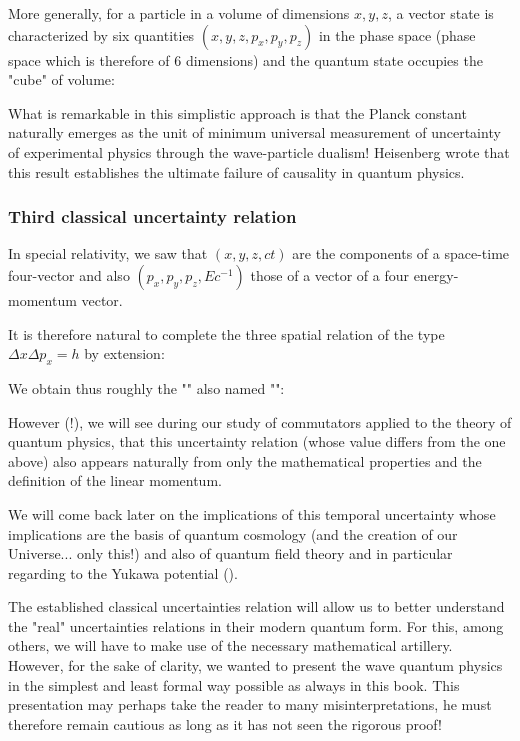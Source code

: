 	More generally, for a particle in a volume  of dimensions $x, y, z$, a vector state is characterized by six quantities $(x,y,z,p_x,p_y,p_z)$ in the phase space (phase space which is therefore of $6$ dimensions) and the quantum state occupies the "cube" of volume:
	
	What is remarkable in this simplistic approach is that the Planck constant naturally emerges as the unit of minimum universal measurement of uncertainty of experimental physics through the wave-particle dualism! Heisenberg wrote that this result establishes the ultimate failure of causality in quantum physics.
	
	\subsubsection{Third classical uncertainty relation}
	In special relativity, we saw that $(x, y, z, ct)$ are the components of a space-time four-vector and also $(p_x,p_y,p_z,Ec^{-1})$ those of a vector of a four energy-momentum vector.

	It is therefore natural to complete the three spatial relation of the type $\Delta x \Delta p_x=h$ by extension:
	
	We obtain thus roughly the "" also named "":
	
	However (!), we will see during our study of commutators applied to the theory of quantum physics, that this uncertainty relation (whose value differs from the one above) also appears naturally from only the mathematical properties and the definition of the linear momentum.
	\begin{tcolorbox}[title=Remark,colframe=black,arc=10pt]
	We will come back later on the implications of this temporal uncertainty whose implications are the basis of quantum cosmology (and the creation of our Universe... only this!) and also of quantum field theory and in particular regarding to the Yukawa potential ().
	\end{tcolorbox}
	The established classical uncertainties relation will allow us to better understand the "real" uncertainties relations in their modern quantum form. For this, among others, we will have to make use of the necessary mathematical artillery. However, for the sake of clarity, we wanted to present the wave quantum physics in the simplest and least formal way possible as always in this book. This presentation may perhaps take the reader to many misinterpretations, he must therefore remain cautious as long as it has not seen the rigorous proof!
	
